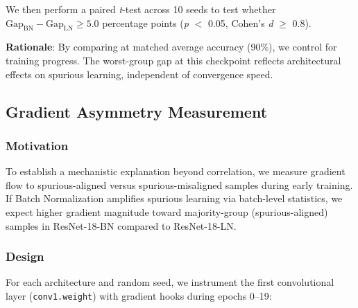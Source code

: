 We then perform a paired \emph{t}-test across 10 seeds to test whether $\text{Gap}_{\text{BN}} - \text{Gap}_{\text{LN}} \geq 5.0$ percentage points (\emph{p} $<$ 0.05, Cohen's \emph{d} $\geq$ 0.8).

\textbf{Rationale}: By comparing at matched average accuracy (90\%), we control for training progress. The worst-group gap at this checkpoint reflects architectural effects on spurious learning, independent of convergence speed.

\subsection{Gradient Asymmetry Measurement}

\subsubsection{Motivation}

To establish a mechanistic explanation beyond correlation, we measure gradient flow to spurious-aligned versus spurious-misaligned samples during early training. If Batch Normalization amplifies spurious learning via batch-level statistics, we expect higher gradient magnitude toward majority-group (spurious-aligned) samples in ResNet-18-BN compared to ResNet-18-LN.

\subsubsection{Design}

For each architecture and random seed, we instrument the first convolutional layer (\texttt{conv1.weight}) with gradient hooks during epochs 0--19:

